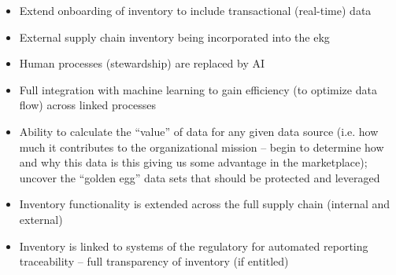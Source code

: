 \kgmmscoringlevelFour

\begin{itemize}
  \item Extend onboarding of inventory to include transactional (real-time) data
  \item External supply chain inventory being incorporated into the \acrshort{ekg}
  \item Human processes (stewardship) are replaced by AI
  \item Full integration with machine learning to gain efficiency (to optimize data flow) across linked processes
  \item Ability to calculate the “value” of data for any given data source (i.e. how much it contributes to the organizational mission – begin to determine how and why this data is this giving us some advantage in the marketplace); uncover the “golden egg” data sets that should be protected and leveraged
\end{itemize}

\kgmmscoringlevelFive

\begin{itemize}
  \item Inventory functionality is extended across the full supply chain (internal and external)
  \item Inventory is linked to systems of the regulatory for automated reporting traceability – full transparency of inventory (if entitled)
\end{itemize}
